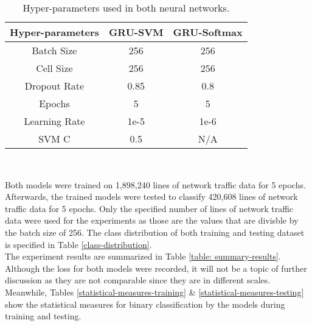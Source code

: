 \begin{table}\centering
\caption{Hyper-parameters used in both neural networks.}
		\begin{tabular}{ccc}
		\toprule
		Hyper-parameters & GRU-SVM & GRU-Softmax \\
		\midrule
		Batch Size & 256 & 256\\
		Cell Size & 256 & 256\\
		Dropout Rate & 0.85 & 0.8\\
		Epochs & 5 & 5\\
		Learning Rate & 1e-5 & 1e-6\\
		SVM C & 0.5 & N/A \\
		\bottomrule
		\end{tabular}\\
		\label{table: hyperparameters}
\end{table}

Both models were trained on 1,898,240 lines of network traffic data for 5 epochs. Afterwards, the trained models were tested to classify 420,608 lines of network traffic data for 5 epochs. Only the specified number of lines of network traffic data were used for the experiments as those are the values that are divisble by the batch size of 256. The class distribution of both training and testing dataset is specified in Table \ref{class-distribution}.\\
\indent	The experiment results are summarized in Table \ref{table: summary-results}. Although the loss for both models were recorded, it will not be a topic of further discussion as they are not comparable since they are in different scales. Meanwhile, Tables \ref{statistical-measures-training} \& \ref{statistical-measures-testing} show the statistical measures for binary classification by the models during training and testing.

